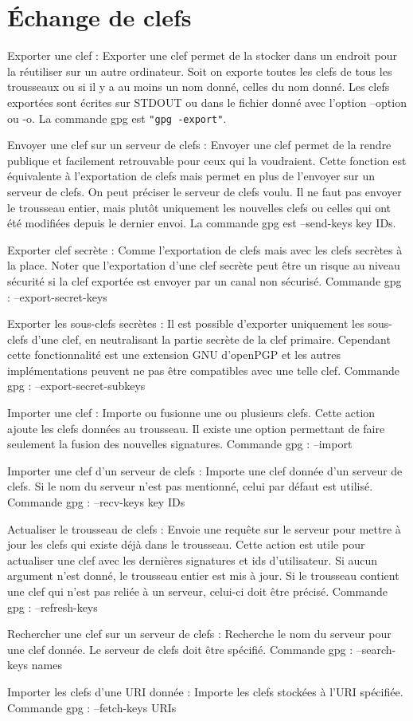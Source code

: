 \section{Échange de clefs}

Exporter une clef :
    Exporter une clef permet de la stocker dans un endroit pour la réutiliser sur un autre ordinateur.
    Soit on exporte toutes les clefs de tous les trousseaux ou si il y a au moins un nom donné, celles du nom donné. Les clefs exportées sont écrites
    sur STDOUT ou dans le fichier donné avec l'option --option ou -o.
    La commande gpg est \texttt{"gpg -\-export"}.

Envoyer une clef sur un serveur de clefs :
    Envoyer une clef permet de la rendre publique et facilement retrouvable pour ceux qui la voudraient.
    Cette fonction est équivalente à l'exportation de clefs mais permet en plus de l'envoyer sur un serveur de clefs. On peut préciser le
    serveur de clefs voulu. Il ne faut pas envoyer le trousseau entier, mais plutôt uniquement les nouvelles clefs ou celles qui ont été modifiées
    depuis le dernier envoi.
    La commande gpg est --send-keys key IDs.

Exporter clef secrète :
    Comme l'exportation de clefs mais avec les clefs secrètes à la place. Noter que l'exportation d'une clef secrète peut être un risque au niveau
    sécurité si la clef exportée est envoyer par un canal non sécurisé.
    Commande gpg : --export-secret-keys


Exporter les sous-clefs secrètes :
    Il est possible d'exporter uniquement les sous-clefs d'une clef, en neutralisant la partie secrète de la clef primaire. Cependant cette fonctionnalité est une extension GNU d'openPGP et les autres implémentations peuvent ne pas être compatibles avec une telle clef.
    Commande gpg : --export-secret-subkeys 

Importer une clef :
    Importe ou fusionne une ou plusieurs clefs. Cette action ajoute les clefs données au trousseau.
    Il existe une option permettant de faire seulement la fusion des nouvelles signatures.
    Commande gpg : --import

Importer une clef d'un serveur de clefs : 
    Importe une clef donnée d'un serveur de clefs. Si le nom du serveur n'est pas mentionné, celui par défaut est utilisé.
    Commande gpg : --recv-keys key IDs

Actualiser le trousseau de clefs : 
    Envoie une requête sur le serveur pour mettre à jour les clefs qui existe déjà dans le trousseau. Cette action est utile pour actualiser une clef
    avec les dernières signatures et ids d'utilisateur. Si aucun argument n'est donné, le trousseau entier est mis à jour. Si le trousseau contient une clef qui n'est pas reliée à un serveur, celui-ci doit être précisé.
    Commande gpg : --refresh-keys

Rechercher une clef sur un serveur de clefs : 
    Recherche le nom du serveur pour une clef donnée. Le serveur de clefs doit être spécifié. 
    Commande gpg : --search-keys names

Importer les clefs d'une URI donnée : 
    Importe les clefs stockées à l'URI spécifiée.
    Commande gpg : --fetch-keys URIs
